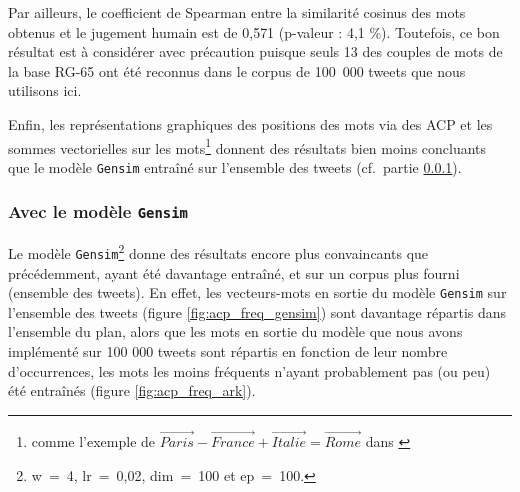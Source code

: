 \documentclass[11pt,french,french]{article}
\let\rmarkdownfootnote\footnote%
\def\footnote{\protect\rmarkdownfootnote}
\begin{document}
Par ailleurs, le coefficient de Spearman entre la similarité cosinus des
mots obtenus et le jugement humain est de 0,571 (p-valeur : 4,1 \%).
Toutefois, ce bon résultat est à considérer avec précaution puisque
seuls 13 des couples de mots de la base RG-65 ont été reconnus dans le
corpus de 100~000 tweets que nous utilisons ici.

Enfin, les représentations graphiques des positions des mots via des ACP
et les sommes vectorielles sur les mots\footnote{comme l'exemple de
  \(\overrightarrow{Paris} - \overrightarrow{France} + \overrightarrow{Italie} = \overrightarrow{Rome}\)
  dans \cite{Mikolov}} donnent des résultats bien moins concluants que
le modèle \texttt{Gensim} entraîné sur l'ensemble des tweets (cf.~partie
\ref{sec:gensimresultats}).

\subsubsection{\texorpdfstring{Avec le modèle
\texttt{Gensim}}{Avec le modèle Gensim}}\label{sec:gensimresultats}

Le modèle \texttt{Gensim}\footnote{w~=~4, lr~=~0,02, dim~=~100 et
  ep~=~100.} donne des résultats encore plus convaincants que
précédemment, ayant été davantage entraîné, et sur un corpus plus fourni
(ensemble des tweets). En effet, les vecteurs-mots en sortie du modèle
\texttt{Gensim} sur l'ensemble des tweets (figure
\ref{fig:acp_freq_gensim}) sont davantage répartis dans l'ensemble du
plan, alors que les mots en sortie du modèle que nous avons implémenté
sur 100 000 tweets sont répartis en fonction de leur nombre
d'occurrences, les mots les moins fréquents n'ayant probablement pas (ou
peu) été entraînés (figure \ref{fig:acp_freq_ark}).
\end{document}
